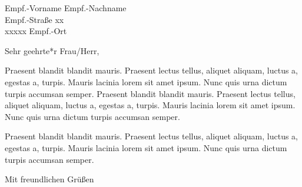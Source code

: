 \documentclass[12pt]{scrlttr2}
\begin{document}
\begin{letter}{Empf.-Vorname Empf.-Nachname\\Empf.-Straße xx\\xxxxx Empf.-Ort}
\opening{Sehr geehrte*r Frau/Herr,}
\RaggedRight
Praesent blandit blandit mauris. Praesent lectus tellus, aliquet aliquam, luctus a, egestas a, turpis. Mauris lacinia lorem sit amet ipsum. Nunc quis urna dictum turpis accumsan semper. Praesent blandit blandit mauris. Praesent lectus tellus, aliquet aliquam, luctus a, egestas a, turpis. Mauris lacinia lorem sit amet ipsum. Nunc quis urna dictum turpis accumsan semper.

Praesent blandit blandit mauris. Praesent lectus tellus, aliquet aliquam, luctus a, egestas a, turpis. Mauris lacinia lorem sit amet ipsum. Nunc quis urna dictum turpis accumsan semper.
\closing{Mit freundlichen Grüßen}
\end{letter}
\end{document}
